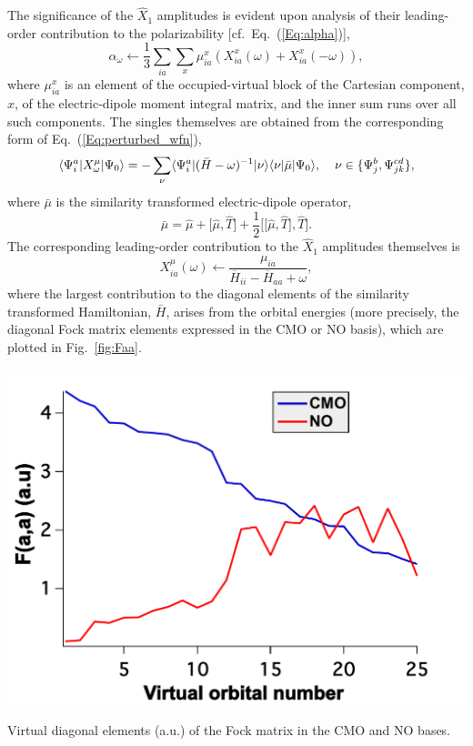The significance of the $\hat{X}_1$ amplitudes is evident upon analysis of
their leading-order contribution to the polarizability [cf.\
Eq.~(\ref{Eq:alpha})],
\begin{equation}
\alpha_\omega \leftarrow \frac{1}{3} \sum\limits_{ia}\sum\limits_x \mu^{x}_{ia}(X^x_{ia}(\omega) +
X^x_{ia}(-\omega)),
\label{Eq:leading_X1}
\end{equation} 
where $\mu^x_{ia}$ is an element of the occupied-virtual block of the
Cartesian component, $x$, of the electric-dipole moment integral matrix, and the inner
sum runs over all such components. The singles
themselves are obtained from the corresponding form of
Eq.~(\ref{Eq:perturbed_wfn}),
\begin{equation} 
\langle\Psi^a_i|X^{\mu}_{\omega}|\Psi_0\rangle =
-\sum_{\nu}\langle\Psi^a_i|(\bar{H} -
\omega)^{-1}|\nu\rangle\langle\nu|\bar{\mu}|\Psi_0\rangle,
\hspace{0.15in}\nu
\in \{\Psi^b_j,\Psi^{cd}_{jk}\},
\label{Eq:singles}
\end{equation} 
where $\bar{\mu}$ is the similarity transformed electric-dipole operator,
\begin{equation}
\bar{\mu} = \hat{\mu} + \bigg[\hat{\mu},\hat{T}\bigg] +
\frac{1}{2}\bigg[\bigg[\hat{\mu},\hat{T}\bigg],\hat{T}\bigg].
\label{Eq:mubar}
\end{equation}
The corresponding leading-order contribution to the $\hat{X}_1$ amplitudes themselves is
\begin{equation}
X^{\mu}_{ia}(\omega) \leftarrow \frac{\mu_{ia}}{\overbar{H}_{ii} -
\overbar{H}_{aa} + \omega},
\label{Eq:X1}
\end{equation}
where the largest contribution to the diagonal elements of the similarity
transformed Hamiltonian, $\bar{H}$, arises from the orbital energies (more
precisely, the diagonal Fock matrix elements expressed in the CMO or NO
basis), which are plotted in Fig.~\ref{fig:Faa}. 
\begin{MyFigure}[h!]
\centering
\includegraphics[width=0.6\linewidth,natwidth=610,natheight=642]{figures_fvno/Faa.pdf}
\caption{{\footnotesize Virtual diagonal elements (a.u.) of the Fock matrix in
the CMO and NO bases.}}
\label{fig:Faa}
\end{MyFigure}
